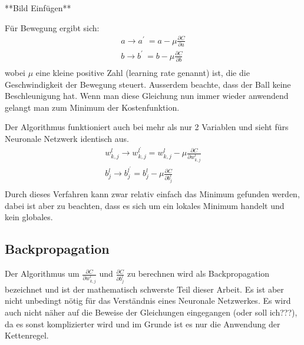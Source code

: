 \documentclass[12pt,a4paper]{report}
\begin{document}
**Bild Einfügen**

Für Bewegung ergibt sich:
\begin{gather*}
    a \rightarrow a^\prime\ = a - \mu\frac{\partial C}{\partial a}\\
    b \rightarrow b^\prime\ = b - \mu\frac{\partial C}{\partial b}\\
\end{gather*}
wobei $\mu$ eine kleine positive Zahl (learning rate genannt) ist, die die Geschwindigkeit der Bewegung steuert.
Ausserdem beachte, dass der Ball keine Beschleunigung hat.
Wenn man diese Gleichung nun immer wieder anwendend gelangt man zum Minimum der Kostenfunktion.

Der Algorithmus funktioniert auch bei mehr als nur 2 Variablen und sieht fürs Neuronale Netzwerk identisch aus.
\begin{gather*}
    w^l_{k,j} \rightarrow w^{l^\prime}_{k,j} = w^l_{k,j} - \mu\frac{\partial C}{\partial w^l_{k,j}}\\
    b^l_j \rightarrow b^{l^\prime}_j = b^l_j - \mu\frac{\partial C}{\partial b^l_j}\\
\end{gather*}
Durch dieses Verfahren kann zwar relativ einfach das Minimum gefunden werden, dabei ist aber zu beachten, dass es sich um ein lokales
Minimum handelt und kein globales.

\subsection{Backpropagation}
Der Algorithmus um $\frac{\partial C}{\partial w^l_{k,j}}$ und $\frac{\partial C}{\partial b^l_j}$ zu berechnen wird als
Backpropagation bezeichnet und ist der mathematisch schwerste Teil dieser Arbeit.
Es ist aber nicht unbedingt nötig für das Verständnis eines Neuronale Netzwerkes.
Es wird auch nicht näher auf die Beweise der Gleichungen eingegangen (oder soll ich???),
da es sonst komplizierter wird und im Grunde ist es nur die Anwendung der Kettenregel.
\end{document}
